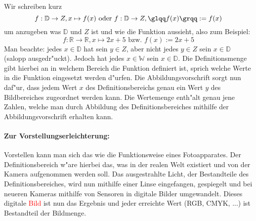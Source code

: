 \begin{flushleft}
Wir schreiben kurz
\begin{equation*}
f : \mathbb{D} \to Z, x \mapsto f(x) \text{ oder } f : \mathbb{D} \to Z, \text{\glqq}f(x)\text{\grqq} := f(x)
\end{equation*}
um anzugeben was $\mathbb{D}$ und $Z$ ist und wie die Funktion aussieht, also zum Beispiel:
\begin{equation*}
f :\mathbb{R} \to \mathbb{R}, x \mapsto 2x + 5 \text{ bzw. } f(x) := 2x + 5
\end{equation*}
Man beachte: jedes $x \in \mathbb{D}$ hat sein $y \in Z$, aber nicht jedes $y \in Z$ sein $x \in \mathbb{D}$ (salopp ausgedr"uckt). Jedoch hat jedes $x \in \mathbb{W}$ sein $x \in \mathbb{D}$. Die Definitions\-menge gibt hierbei an in welchem Bereich die Funktion definiert ist, sprich welche Werte \glqq in die Funktion eingesetzt werden d"urfen\grqq . Die Abbildungs\-vorschrift sorgt nun daf"ur, dass jedem Wert $x$ des Definitions\-bereichs genau ein Wert $y$ des Bild\-bereiches zugeordnet werden kann. Die Wertemenge enth"alt genau jene Zahlen, welche man durch Abbildung des Definitions\-bereiches mithilfe der Abbildungs\-vorschrift erhalten kann.

\paragraph{Zur Vorstellungserleichterung:}
Vorstellen kann man sich das wie die Funktionsweise eines Fotoapparates. Der Definitionsbereich w"are hierbei das, was in der realen Welt existiert und von der Kamera aufgenommen werden soll. Das ausgestrahlte Licht, der Bestandteile des Definitionsbereiches, wird nun mithilfe einer Linse eingefangen, gespiegelt und bei neueren Kameras mithilfe von Sensoren in digitale Bilder umgewandelt. Dieses digitale \textcolor{red}{Bild} ist nun das Ergebnis und jeder erreichte Wert (RGB, CMYK, ...) ist Bestandteil der Bildmenge.
\begin{figure}[h!]
 \centering
\end{figure}
\end{flushleft}
